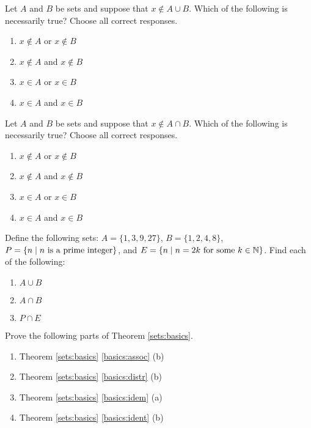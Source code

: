 \begin{exercise}
Let $A$ and $B$ be sets and suppose that $x\notin A\cup B$. Which of the following is necessarily true? Choose all correct responses.
\begin{enumerate}
\item $x\notin A$ or $x\notin B$
\item $x\notin A$ and $x\notin B$
\item $x\in A$ or $x\in B$
\item $x\in A$ and $x\in B$
\end{enumerate}
\end{exercise}

\begin{exercise}\label{exer:negint}
\markit Let $A$ and $B$ be sets and suppose that $x\notin A\cap B$. Which of the following is necessarily true? Choose all correct responses.
\begin{enumerate}
\item $x\notin A$ or $x\notin B$
\item\label{negint:correct} $x\notin A$ and $x\notin B$
\item $x\in A$ or $x\in B$
\item $x\in A$ and $x\in B$
\end{enumerate}
\end{exercise}

\begin{exercise}
Define the following sets: $A=\{1,3,9,27\}$, $B=\{1,2,4,8\}$, $P=\{
n\mid n \hbox{ is a prime integer}\}$, and $E=\{ n\mid n=2k \hbox{ for
some } k\in{\mathbb N}\}$. Find each of the following:
\begin{enumerate}
\item $A\cup B$
\item $A\cap B$
\item $P\cap E$
\end{enumerate}
\end{exercise}

\begin{exercise}\label{exer:basics}
Prove the following parts of Theorem \ref{sets:basics}.
\begin{enumerate}
\item Theorem \ref{sets:basics} \ref{basics:assoc} (b)
\item Theorem \ref{sets:basics} \ref{basics:distr} (b)
\item Theorem \ref{sets:basics} \ref{basics:idem} (a)
\item Theorem \ref{sets:basics} \ref{basics:ident} (b)
\end{enumerate}
\end{exercise}

